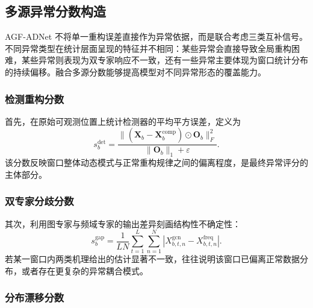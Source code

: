 \documentclass[bachelor, vlined]{DissertUESTC}
\begin{document}
    \subsection{多源异常分数构造}
    
    AGF-ADNet 不将单一重构误差直接作为异常依据，而是联合考虑三类互补信号。不同异常类型在统计层面呈现的特征并不相同：某些异常会直接导致全局重构困难，某些异常则表现为双专家响应不一致，还有一些异常主要体现为窗口统计分布的持续偏移。融合多源分数能够提高模型对不同异常形态的覆盖能力。
    
    \subsubsection{检测重构分数}
    
    首先，在原始可观测位置上统计检测器的平均平方误差，定义为
    \begin{equation}
        s_b^{\mathrm{det}}
        =
        \frac{\|(\hat{\mathbf{X}}_b-\mathbf{X}_b^{\mathrm{comp}})\odot \mathbf{O}_b\|_F^2}{\|\mathbf{O}_b\|_1 + \varepsilon}.
    \end{equation}
    该分数反映窗口整体动态模式与正常重构规律之间的偏离程度，是最终异常评分的主体部分。
    
    \subsubsection{双专家分歧分数}
    
    其次，利用图专家与频域专家的输出差异刻画结构性不确定性：
    \begin{equation}
        s_b^{\mathrm{gap}}
        =
        \frac{1}{LN}
        \sum_{t=1}^{L}\sum_{n=1}^{N}
        \left|
            X_{b,t,n}^{\mathrm{gcn}} - X_{b,t,n}^{\mathrm{freq}}
        \right|.
    \end{equation}
    若某一窗口内两类机理给出的估计显著不一致，往往说明该窗口已偏离正常数据分布，或者存在更复杂的异常耦合模式。
    
    \subsubsection{分布漂移分数}
    
\end{document}
